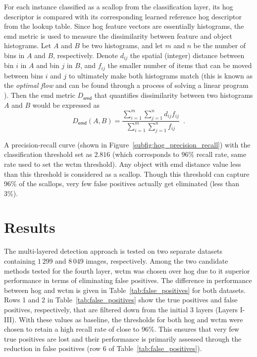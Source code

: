 \documentclass {udthesis}
\begin{document}
For each instance classified as a scallop from the classification layer, its \gls{hog} descriptor is compared with its corresponding learned reference \gls{hog} descriptor from the lookup table.
Since \gls{hog} feature vectors are essentially histograms, the \gls{emd} metric \cite{rubner} is used to measure the dissimilarity between feature and object histograms.
Let $A$ and $B$ be two histograms, and let $m$ and $n$ be the number of bins in $A$ and $B$, respectively.
Denote $d_{ij}$ the spatial (integer) distance between bin $i$ in $A$ and bin $j$ in $B$, and $f_{ij}$ the smaller number of items that can be moved between bins $i$ and $j$ to ultimately make both histograms match (this is known as the \emph{optimal flow} and can be found through a process of solving a linear program \cite{rubner}).
Then the \gls{emd} metric $D_\mathsf{emd}$ that quantifies dissimilarity between two histograms $A$ and $B$ would be expressed as
%
\[
 D_\mathsf{emd}(A,B)=\frac{\sum_{i=1}^m\sum_{j=1}^nd_{ij}f_{ij}}{\sum_{i=1}^m\sum_{j=1}^nf_{ij}} \enspace.
\]


A precision-recall curve (shown in Figure~\ref{subfig:hog_precision_recall}) with the classification threshold set as $2.816$ (which corresponds to 96\% recall rate, same rate used to set the \gls{wctm} threshold). 
Any object with \gls{emd} distance value less than this threshold is considered as a scallop.
 Though this threshold can capture 96\% of the scallops, very few false positives actually get eliminated (less than 3\%).

\section{Results}
%
The multi-layered detection approach is tested on two separate datasets containing  $1\,299$ and $8\,049$ images, respectively.
Among the two candidate methods tested for the fourth layer, \gls{wctm} was chosen over \gls{hog} due to it superior performance in terms of eliminating false positives. 
The difference in performance between \gls{hog} and \gls{wctm} is given in Table~\ref{tab:false_positives} for both datasets. 
Rows 1 and 2 in Table~\ref{tab:false_positives} show the true positives and false positives, respectively, that are filtered down from the initial 3 layers (Layers I-III). 
With these values as baseline, the thresholds for both \gls{hog} and \gls{wctm} were chosen to retain a high recall rate of close to 96\%. 
This ensures that very few true positives are lost and their performance is primarily assessed through the reduction in false positives (row 6 of Table~\ref{tab:false_positives}). 
\end{document}
